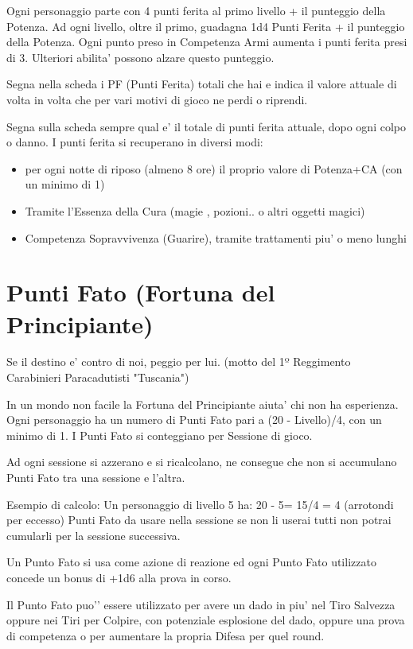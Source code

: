 \documentclass[a4paper,11pt,twoside,openany]{dndbook}
\begin{document}
Ogni personaggio parte con 4 punti ferita al primo livello + il punteggio della Potenza.
Ad ogni livello, oltre il primo, guadagna 1d4 Punti Ferita + il punteggio della Potenza. 
Ogni punto preso in Competenza Armi aumenta i punti ferita presi di 3. Ulteriori abilita’ possono alzare questo punteggio.

Segna nella scheda i PF (Punti Ferita) totali che hai e indica il valore attuale di volta in volta che per vari motivi di gioco ne perdi o riprendi.

Segna sulla scheda sempre qual e’ il totale di punti ferita attuale, dopo ogni colpo o danno.
I punti ferita si recuperano in diversi modi:

\begin{itemize}
\item 
per ogni notte di riposo (almeno 8 ore) il proprio valore di Potenza+CA (con un minimo di 1) 
\item
 Tramite l'Essenza della Cura (magie , pozioni.. o altri oggetti magici) 
\item 
Competenza Sopravvivenza (Guarire), tramite trattamenti piu' o meno lunghi 
\end{itemize}


\section{Punti Fato (Fortuna del Principiante)}
\begin{quotebox}Se il destino e' contro di noi, peggio per lui. (motto del 1º Reggimento Carabinieri Paracadutisti "Tuscania")
\end{quotebox}

In un mondo non facile la Fortuna del Principiante aiuta’ chi non ha esperienza.
Ogni personaggio ha un numero di Punti Fato pari a (20 - Livello)/4, con un minimo di 1. I Punti Fato si conteggiano per Sessione di gioco. 

Ad ogni sessione si azzerano e si ricalcolano, ne consegue che non si accumulano Punti Fato tra una sessione e l’altra.

Esempio di calcolo:
Un personaggio di livello 5 ha: 20 - 5= 15/4 = 4 (arrotondi per eccesso) Punti Fato da usare nella sessione se non li userai tutti non potrai cumularli per la sessione successiva.

Un Punto Fato si usa come azione di reazione ed ogni Punto Fato utilizzato concede un bonus di +1d6 alla prova in corso. 

Il Punto Fato puo'’ essere utilizzato per avere un dado in piu' nel Tiro Salvezza oppure nei Tiri per Colpire, con potenziale esplosione del dado, oppure una prova di competenza o per aumentare la propria Difesa per quel round.
\end{document}
